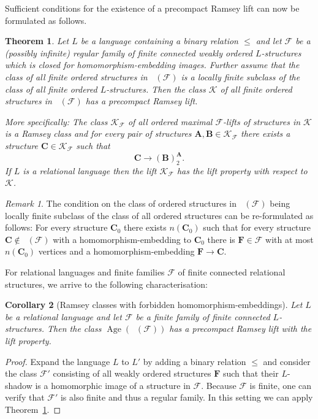 \documentclass{elsarticle}
\def\Forb{\mathop{\mathrm{Forb_{he}}}\nolimits}
\def\Age{\mathop{\mathrm{Age}}\nolimits}
\def\str#1{\mathbf {#1}}
\def\F{{\mathcal F}}
\def\K{{\mathcal K}}
\theoremstyle{plain}
\newtheorem{theorem}{Theorem}[section]
\newtheorem{corollary}[theorem]{Corollary}
\theoremstyle{definition}
\theoremstyle{remark}
\newtheorem*{remark}{Remark}
\begin{document}
Sufficient conditions for the existence of a precompact Ramsey lift can now be formulated
as follows.

\begin{theorem}
\label{thm:main}
Let $L$ be a language containing a binary relation  $\leq$ and let $\mathcal F$ be a (possibly infinite) regular family of finite connected weakly ordered $L$-structures which is closed for homomorphism-embedding images.
Further assume that the class of all finite ordered structures in $\Forb(\mathcal F)$ is a locally finite subclass of the class of all finite ordered $L$-structures.
Then the class $\mathcal K$ of all finite ordered structures in $\Forb(\F)$ has a precompact Ramsey lift.

More specifically:
The class $\mathcal K_\F$ of all ordered maximal $\F$-lifts of structures in $\mathcal K$ is a Ramsey class
and
for every pair of struc\-tures $\str{A}, \str{B}\in\mathcal K_\mathcal F$ there exists a 
structure $\str{C} \in \mathcal K_\mathcal F$  such that
$$
\str{C} \longrightarrow (\str{B})^{\str{A}}_2.
$$
If $L$ is a relational language then the lift $\mathcal K_\mathcal F$ has the lift property
with respect to $\K$.
\end{theorem}
\begin{remark}
The condition on the class of ordered structures in $\Forb(\F)$ being locally finite subclass of the class of all ordered structures can be re-formulated as follows: For every structure
$\str{C}_0$ there exists $n(\str{C}_0)$ such that for every structure $\str{C} \notin \Forb(\F)$ with a homomorphism-embedding to $\str{C}_0$ there
is $\str{F}\in\F$ with at most $n(\str{C}_0)$ vertices and a homomorphism-embedding $\str{F}\to \str{C}$.
\end{remark}

 For relational languages and finite families $\F$ of finite connected relational structures, we arrive to the following characterisation:

\begin{corollary}[Ramsey classes with forbidden homomorphism-embeddings]
\label{cor:forbH}
Let $L$ be a relational language and let $\F$ be a finite family of finite connected $L$-structures.
Then the class $\Age(\Forb(\F))$ has a precompact Ramsey lift with the lift property.
\end{corollary}
\begin{proof}
Expand the language $L$ to $L'$ by adding a binary relation $\leq$ and consider the class $\F'$ consisting of 
all weakly ordered structures $\str{F}$ such that their $L$-shadow is a homomorphic image of a structure in $\F$.
Because $\F$ is finite, one can verify that $\F'$ is also finite and thus a regular family.
In this setting we can apply Theorem~\ref{thm:main}.
\end{proof}
\end{document}
